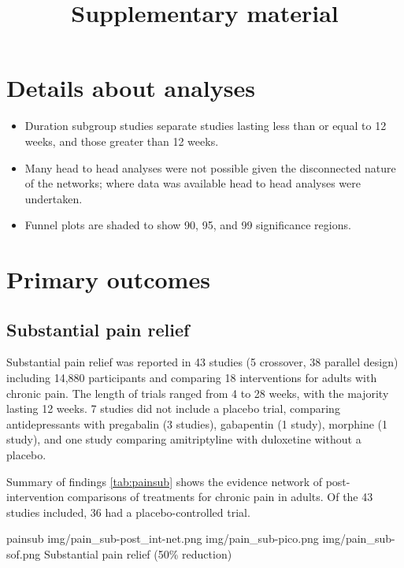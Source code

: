\documentclass{report}\usepackage[]{graphicx}\usepackage[]{color}
\title{Supplementary material}
\begin{document}
\maketitle

\tableofcontents

\listoftables

\listoffigures


\chapter{Details about analyses}

\begin{itemize}

\item Duration subgroup studies separate studies lasting less than or equal to 12 weeks, and those greater than 12 weeks.
\item Many head to head analyses were not possible given the disconnected nature of the networks; where data was available head to head analyses were undertaken.
\item Funnel plots are shaded to show 90, 95, and 99 significance regions.


\end{itemize}




\chapter{Primary outcomes}

\section{Substantial pain relief}

Substantial pain relief was reported in 43 studies (5 crossover,  38 parallel design) including 14,880 participants and comparing 18 interventions for adults with chronic pain.  The length of trials ranged from 4 to 28 weeks, with the majority lasting 12 weeks. 7 studies did not include a placebo trial, comparing antidepressants with pregabalin (3 studies), gabapentin (1 study), morphine (1 study), and one study comparing amitriptyline with duloxetine without a placebo.

Summary of findings \ref{tab:painsub} shows the evidence network of post-intervention comparisons of treatments for chronic pain in adults. Of the 43 studies included, 36 had a placebo-controlled trial.

\soffignew
{painsub}
{img/pain_sub-post_int-net.png}
{img/pain_sub-pico.png}
{img/pain_sub-sof.png}
{Substantial pain relief (50\% reduction)}
\end{document}
